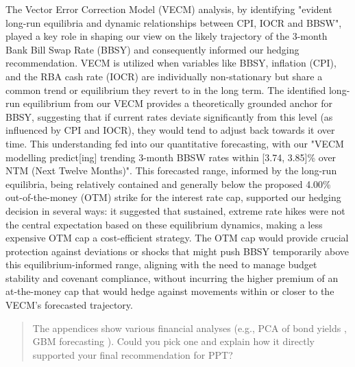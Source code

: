 \documentclass[11pt, a4paper, british]{article}
\begin{document}
The Vector Error Correction Model (VECM) analysis, by identifying "evident long-run equilibria and dynamic relationships between CPI, IOCR and BBSW", played a key role in shaping our view on the likely trajectory of the 3-month Bank Bill Swap Rate (BBSY) and consequently informed our hedging recommendation. VECM is utilized when variables like BBSY, inflation (CPI), and the RBA cash rate (IOCR) are individually non-stationary but share a common trend or equilibrium they revert to in the long term. The identified long-run equilibrium from our VECM provides a theoretically grounded anchor for BBSY, suggesting that if current rates deviate significantly from this level (as influenced by CPI and IOCR), they would tend to adjust back towards it over time. This understanding fed into our quantitative forecasting, with our "VECM modelling predict[ing] trending 3-month BBSW rates within [3.74, 3.85]\% over NTM (Next Twelve Months)". This forecasted range, informed by the long-run equilibria, being relatively contained and generally below the proposed 4.00\% out-of-the-money (OTM) strike for the interest rate cap, supported our hedging decision in several ways: it suggested that sustained, extreme rate hikes were not the central expectation based on these equilibrium dynamics, making a less expensive OTM cap a cost-efficient strategy. The OTM cap would provide crucial protection against deviations or shocks that might push BBSY temporarily above this equilibrium-informed range, aligning with the need to manage budget stability and covenant compliance, without incurring the higher premium of an at-the-money cap that would hedge against movements within or closer to the VECM's forecasted trajectory.

\newpage

\begin{quote}
    The appendices show various financial analyses (e.g., PCA of bond yields , GBM forecasting ). Could you pick one and explain how it directly supported your final recommendation for PPT?
\end{quote}
\end{document}

